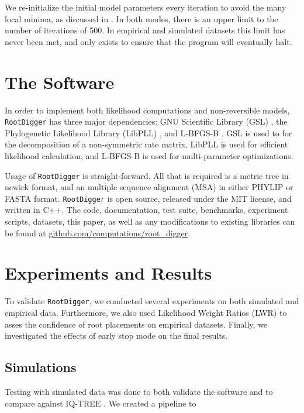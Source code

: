 \documentclass{article}
\newcommand{\RootDiggertt}{\texttt{RootDigger}}
\begin{document}
We re-initialize the initial model parameters every iteration to avoid the many
local minima, as discussed in \cite{huelsenbeck_inferring_2002}. In both modes,
there is an upper limit to the number of iterations of 500. In empirical and
simulated datasets this limit has never been met, and only exists to ensure
that the program will eventually halt.

\section{The Software}

In order to implement both likelihood computations and non-reversible models,
\RootDiggertt{} has three major dependencies: GNU Scientific Library (GSL)
\cite{gough_gnu_2009}, the Phylogenetic Likelihood Library (LibPLL)
\cite{flouri_phylogenetic_2015}, and L-BFGS-B \cite{zhu_algorithm_1997}.  GSL is
used to for the decomposition of a non-symmetric rate matrix, LibPLL is used for
efficient likelihood calculation, and L-BFGS-B is used for multi-parameter
optimizations.

Usage of \RootDiggertt{} is straight-forward. All that is required is a metric
tree in newick format, and an multiple sequence alignment (MSA) in either PHYLIP
or FASTA format. \RootDiggertt{} is open source, released under the MIT license,
and written in C++. The code, documentation, test suite, benchmarks, experiment
scripts, datasets, this paper, as well as any modifications to existing
libraries can be found at \url{github.com/computations/root_digger}.

\section{Experiments and Results}

To validate \RootDiggertt{}, we conducted several experiments on both simulated
and empirical data. Furthermore, we also used Likelihood Weight Ratios (LWR)
\cite{strimmer_inferring_2002} to asses the confidence of root placements on
empirical datasets. Finally, we investigated the effects of early stop mode on the
final results.

\subsection{Simulations}

Testing with simulated data was done to both validate the software and to
compare against IQ-TREE \cite{minh_iq-tree_2019}.
We created a pipeline to
\end{document}
